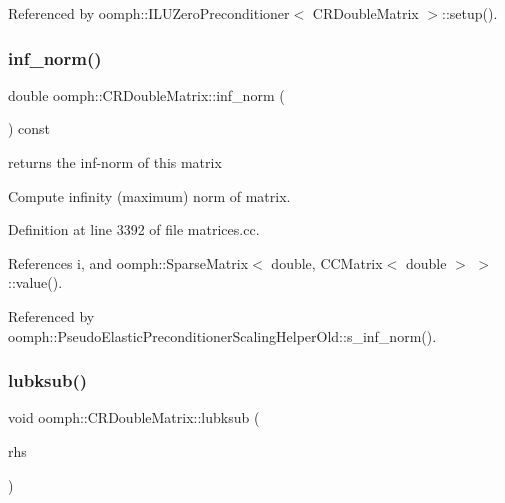 Referenced by oomph\+::\+I\+L\+U\+Zero\+Preconditioner$<$ C\+R\+Double\+Matrix $>$\+::setup().

\mbox{\label{classoomph_1_1CRDoubleMatrix_a6cd938ba5f026f1508239cef05b16cb4}} 
\subsubsection{\texorpdfstring{inf\+\_\+norm()}{inf\_norm()}}
{\footnotesize\ttfamily double oomph\+::\+C\+R\+Double\+Matrix\+::inf\+\_\+norm (\begin{DoxyParamCaption}{ }\end{DoxyParamCaption}) const}



returns the inf-\/norm of this matrix 

Compute infinity (maximum) norm of matrix. 

Definition at line 3392 of file matrices.\+cc.



References i, and oomph\+::\+Sparse\+Matrix$<$ double, C\+C\+Matrix$<$ double $>$ $>$\+::value().



Referenced by oomph\+::\+Pseudo\+Elastic\+Preconditioner\+Scaling\+Helper\+Old\+::s\+\_\+inf\+\_\+norm().

\mbox{\label{classoomph_1_1CRDoubleMatrix_af2c0f286f77ca44453f0da684b8f9dc7}} 
\subsubsection{\texorpdfstring{lubksub()}{lubksub()}}
{\footnotesize\ttfamily void oomph\+::\+C\+R\+Double\+Matrix\+::lubksub (\begin{DoxyParamCaption}\item[{\hyperlink{classoomph_1_1DoubleVector}{Double\+Vector} \&}]{rhs }\end{DoxyParamCaption})\hspace{0.3cm}{\ttfamily [virtual]}}



